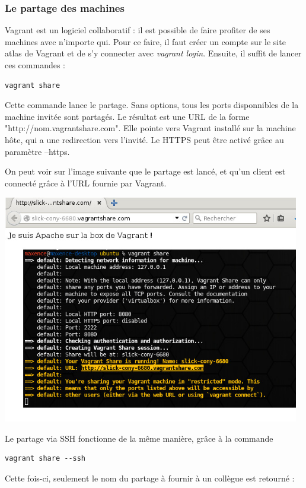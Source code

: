 \documentclass[12pt,a4paper]{article}
\begin{document}
\subsubsection{Le partage des machines}
Vagrant est un logiciel collaboratif : il est possible de faire profiter de ses machines avec n'importe qui. Pour ce faire, il faut créer un compte sur le site atlas de Vagrant et de s'y connecter avec \textit{vagrant login}. Ensuite, il suffit de lancer ces commandes :
\begin{lstlisting}
vagrant share
\end{lstlisting}

Cette commande lance le partage. Sans options, tous les ports disponnibles de la machine invitée sont partagés. Le résultat est une URL de la forme "http://nom.vagrantshare.com". Elle pointe vers Vagrant installé sur la machine hôte, qui a une redirection vers l'invité. Le HTTPS peut être activé grâce au paramètre --https.

On peut voir sur l'image suivante que le partage est lancé, et qu'un client est connecté grâce à l'URL fournie par Vagrant.

\begin{center}
	\includegraphics[width=13cm]{images_rapport/sharehttp.jpg}
\end{center}

Le partage via SSH fonctionne de la même manière, grâce à la commande
\begin{lstlisting}
vagrant share --ssh
\end{lstlisting}
Cette fois-ci, seulement le nom du partage à fournir à un collègue est retourné :
\end{document}
